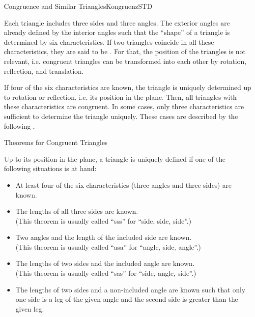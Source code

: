 \begin{MXContent}{Congruence and Similar Triangles}{Kongruenz}{STD}

Each triangle includes three sides and three angles. The 
exterior angles are already defined by the interior angles such that 
the ``shape'' of a triangle is determined by six characteristics. If two 
triangles coincide in all these characteristics, they are said to be 
. For that, the position of the 
triangles is not relevant, i.e. congruent triangles can be transformed into 
each other by rotation, reflection, and translation.

If four of the six characteristics are known, the triangle is uniquely determined
up to rotation or reflection, i.e. its position in the plane. Then, all triangles with these 
characteristics are congruent. In some cases, only three characteristics are sufficient
to determine the triangle uniquely. These cases are described by the following 
.


\begin{MXInfo}{Theorems for Congruent Triangles}%
%

Up to its position in the plane, a triangle is uniquely defined if one of the 
following situations is at hand:

\begin{itemize}
 \item At least four of the six characteristics (three angles and three sides) are known.
 
 \item The lengths of all three sides are known. \\ (This theorem is usually called 
  ``sss'' for ``side, side, side''.)

 
 \item Two angles and the length of the included side are known. \\ (This theorem is 
  usually called ``asa'' for ``angle, side, angle''.)
        
 \item The lengths of two sides and the included angle are known. \\ (This theorem is 
  usually called ``sas'' for ``side, angle, side''.)
       
             
 \item The lengths of two sides and a non-included angle are known such that 
  only one side is a leg of the given angle and the second side is greater than the 
  given leg. 


\end{itemize}
\end{MXInfo}
\end{MXContent}
